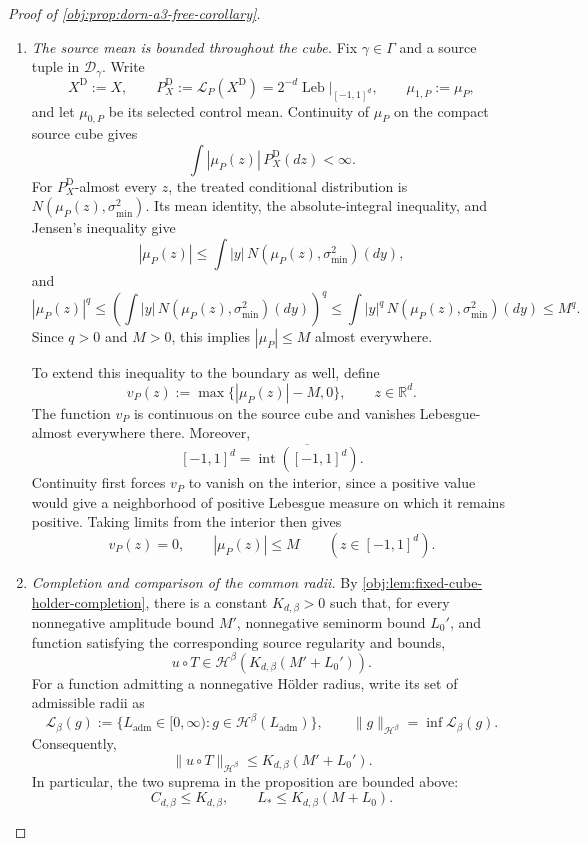 \begin{proof}[Proof of \cref{obj:prop:dorn-a3-free-corollary}]
\begin{enumerate}
\item \emph{The source mean is bounded throughout the cube.}
Fix \(\gamma\in\Gamma\) and a source tuple in \(\mathcal D_\gamma\). Write
\[
X^{\mathrm D}:=X,
\qquad
P_X^{\mathrm D}:=\mathcal L_P(X^{\mathrm D})
=2^{-d}\operatorname{Leb}\big|_{[-1,1]^d},
\qquad
\mu_{1,P}:=\mu_P,
\]
and let \(\mu_{0,P}\) be its selected control mean. Continuity of \(\mu_P\) on the compact source cube gives
\[
\int |\mu_P(z)|\,P_X^{\mathrm D}(dz)<\infty.
\]
For \(P_X^{\mathrm D}\)-almost every \(z\), the treated conditional distribution is
\(N(\mu_P(z),\sigma_{\min}^2)\). Its mean identity, the absolute-integral inequality, and Jensen's inequality give
\[
|\mu_P(z)|
\le
\int |y|\,N(\mu_P(z),\sigma_{\min}^2)(dy),
\]
and
\[
|\mu_P(z)|^q
\le
\left(\int |y|\,N(\mu_P(z),\sigma_{\min}^2)(dy)\right)^q
\le
\int |y|^q\,N(\mu_P(z),\sigma_{\min}^2)(dy)
\le M^q.
\]
Since \(q>0\) and \(M>0\), this implies \(|\mu_P|\le M\) almost everywhere.

To extend this inequality to the boundary as well, define
\[
v_P(z):=\max\{|\mu_P(z)|-M,0\},
\qquad z\in\mathbb R^d.
\]
The function \(v_P\) is continuous on the source cube and vanishes Lebesgue-almost everywhere there. Moreover,
\[
[-1,1]^d
=
\overline{\operatorname{int}([-1,1]^d)}.
\]
Continuity first forces \(v_P\) to vanish on the interior, since a positive value would give a neighborhood of positive Lebesgue measure on which it remains positive. Taking limits from the interior then gives
\[
v_P(z)=0,
\qquad
|\mu_P(z)|\le M
\qquad(z\in[-1,1]^d).
\]

\item \emph{Completion and comparison of the common radii.}
By \cref{obj:lem:fixed-cube-holder-completion}, there is a constant \(K_{d,\beta}>0\) such that, for every nonnegative amplitude bound \(M'\), nonnegative seminorm bound \(L_0'\), and function satisfying the corresponding source regularity and bounds,
\[
u\circ T
\in
\mathcal H^\beta\!\left(K_{d,\beta}(M'+L_0')\right).
\]
For a function admitting a nonnegative Hölder radius, write its set of admissible radii as
\[
\mathscr L_\beta(g)
:=
\{L_{\mathrm{adm}}\in[0,\infty):
g\in\mathcal H^\beta(L_{\mathrm{adm}})\},
\qquad
\|g\|_{\mathcal H^\beta}
=
\inf\mathscr L_\beta(g).
\]
Consequently,
\[
\|u\circ T\|_{\mathcal H^\beta}
\le K_{d,\beta}(M'+L_0').
\]
In particular, the two suprema in the proposition are bounded above:
\[
C_{d,\beta}\le K_{d,\beta},
\qquad
L_*\le K_{d,\beta}(M+L_0).
\]


\end{enumerate}
\end{proof}
